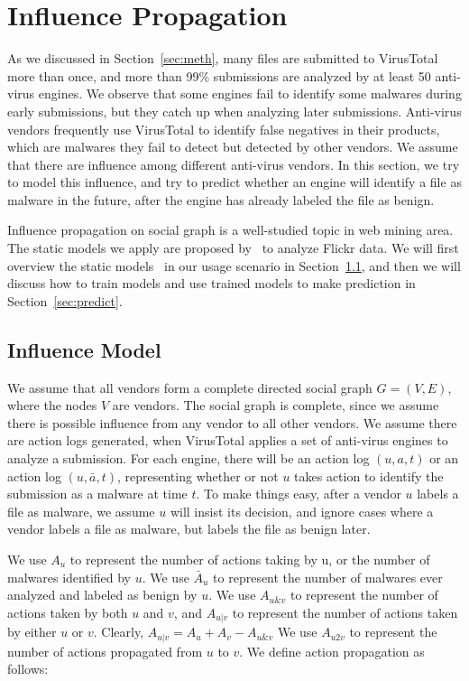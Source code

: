 \section{Influence Propagation}
\label{sec:influ}

As we discussed in Section~\ref{sec:meth}, 
many files are submitted to VirusTotal more than once, 
and more than 99\% submissions are analyzed by at least 50 anti-virus engines. 
We observe that some engines fail to identify some malwares during early submissions, 
but they catch up when analyzing later submissions. 
Anti-virus vendors frequently use VirusTotal to identify false negatives in their products, 
which are malwares they fail to detect but detected by other vendors. 
We assume that there are influence among different anti-virus vendors.
In this section, we try to model this influence,
and try to predict whether an engine will identify a file as malware in the future, 
after the engine has already labeled the file as benign.

Influence propagation on social graph is a well-studied topic in web mining area. 
The static models we apply are proposed by~\citet{Influence} to analyze Flickr data.
We will first overview the static models~\cite{Influence} in our usage scenario in Section~\ref{sec:model}, 
and then we will discuss how to train models and use trained models to make prediction in Section~\ref{sec:predict}.  

\subsection{Influence Model}
\label{sec:model}


We assume that all vendors form a complete directed social graph $G = (V, E)$, 
where the nodes $V$ are vendors. 
The social graph is complete, 
since we assume there is possible influence from any vendor to all other vendors.
We assume there are action logs generated, 
when VirusTotal applies a set of anti-virus engines to analyze a submission. 
For each engine, there will be an action log $(u, a, t)$ or an action log $(u, \bar{a}, t)$, 
representing whether or not $u$ takes action to identify the submission as a malware at time $t$. 
To make things easy, after a vendor $u$ labels a file as malware, 
we assume $u$ will insist its decision, 
and ignore cases where a vendor labels a file as malware, but labels the file as benign later. 

We use $A_u$ to represent the number of actions taking by u, 
or the number of malwares identified by $u$. 
We use $\bar{A}_u$ to represent the number of malwares ever analyzed and labeled as benign by $u$.
We use $A_{u\&v}$ to represent the number of actions taken by both $u$ and $v$, 
and $A_{u|v}$ to represent the number of actions taken by either $u$ or $v$.
Clearly, $A_{u|v} =   A_u + A_v - A_{u\&v}$
We use $A_{u2v}$ to represent the number of actions propagated from $u$ to $v$. 
We define action propagation as follows: 

